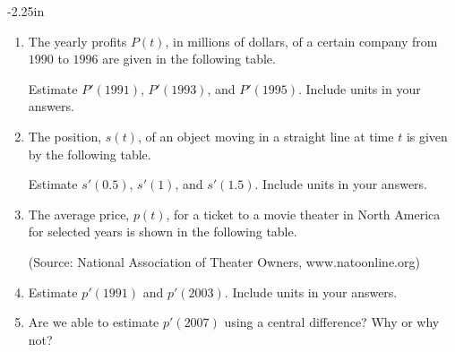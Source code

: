 \begin{adjustwidth*}{}{-2.25in}
\begin{multicols*}{2}
\begin{enumerate}[1),resume]
\item The yearly profits $P(t)$, in millions of dollars, of a certain company from $1990$ to $1996$ are given in the following table.


Estimate $P'(1991)$, $P'(1993)$, and $P'(1995)$.  Include units in your answers.

\item The position, $s(t)$, of an object moving in a straight line at time $t$ is given by the following table.

\begin{center}
\end{center}

Estimate $s'(0.5)$, $s'(1)$, and $s'(1.5)$.  Include units in your answers.

\item The average price, $p(t)$, for a ticket to a movie theater in North America for selected years is shown in the following table.


{\footnotesize (Source: National Association of Theater Owners, www.natoonline.org)}

\ba
\item Estimate $p'(1991)$ and $p'(2003)$.  Include units in your answers.
\item Are we able to estimate $p'(2007)$ using a central difference?  Why or why not?
\ea


\end{enumerate}
\end{multicols*}
\end{adjustwidth*}
